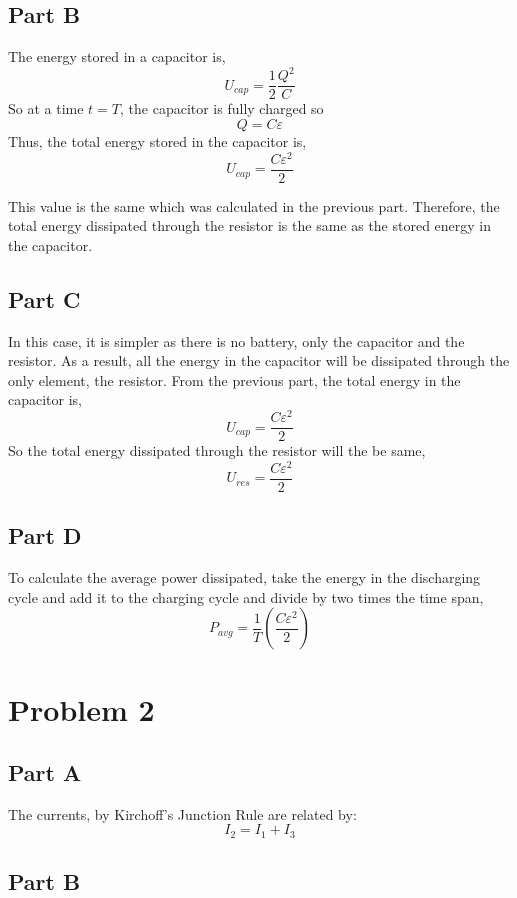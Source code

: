 \documentclass{article}
\begin{document}
\subsection*{Part B}

The energy stored in a capacitor is,
$$ U_{cap} = \frac{1}{2} \frac{Q^2}{C} $$
So at a time $t = T$, the capacitor is fully charged so
$$ Q = C \varepsilon $$
Thus, the total energy stored in the capacitor is,
$$ U_{cap} = \frac{C \varepsilon^2}{2} $$

This value is the same which was calculated in the previous part. Therefore, the
total energy dissipated through the resistor is the same as the stored energy in
the capacitor.

\subsection*{Part C}

In this case, it is simpler as there is no battery, only the capacitor and the
resistor. As a result, all the energy in the capacitor will be dissipated
through the only element, the resistor. From the previous part, the total
energy in the capacitor is,
$$ U_{cap} = \frac{C \varepsilon^2}{2} $$
So the total energy dissipated through the resistor will the be same,
$$ U_{res} = \frac{C \varepsilon^2}{2} $$

\subsection*{Part D}

To calculate the average power dissipated, take the energy in the discharging
cycle and add it to the charging cycle and divide by two times the time span,
$$ P_{avg} = \frac{1}{T} \left( \frac{C \varepsilon^2}{2} \right) $$

\section*{Problem 2}

\subsection*{Part A}

The currents, by Kirchoff's Junction Rule are related by:
$$ I_2 = I_1 + I_3 $$

\subsection*{Part B}
\end{document}
